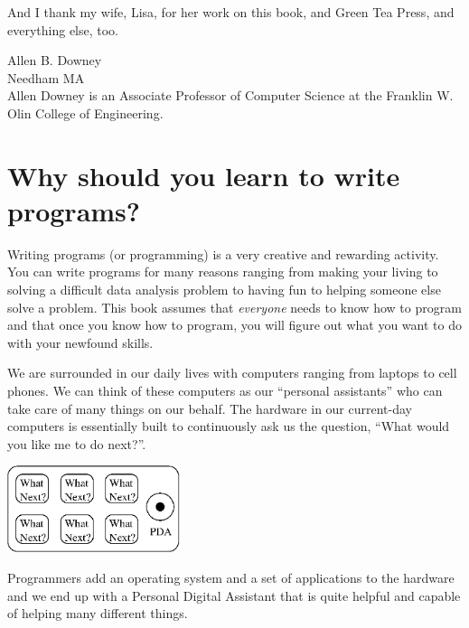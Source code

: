 \documentclass[11pt]{book}
\begin{document}
And I thank my wife, Lisa, for her work on this book, and Green
Tea Press, and everything else, too.

Allen B. Downey \\
Needham MA\\

Allen Downey is an Associate Professor of Computer Science at 
the Franklin W. Olin College of Engineering.


\clearemptydoublepage

\begin{latexonly}

\tableofcontents

\clearemptydoublepage

\end{latexonly}

\mainmatter

\chapter{Why should you learn to write programs?}

Writing programs (or programming) is a very creative 
and rewarding activity.  You can write programs for 
many reasons ranging from making your living to solving
a difficult data analysis problem to having fun to helping
someone else solve a problem.  This book assumes that 
\emph{everyone} needs to know how to program and that once 
you know how to program, you will figure out what you want 
to do with your newfound skills.  

We are surrounded in our daily lives with computers ranging 
from laptops to cell phones.  We can think of these computers
as our ``personal assistants'' who can take care of many things
on our behalf.  The hardware in our current-day computers 
is essentially built to continuously ask us the question, 
``What would you like me to do next?''.

\beforefig
\centerline{\includegraphics[height=1.00in]{figs2/pda.eps}}
\afterfig

Programmers add an operating system and a set of applications
to the hardware and we end up with a Personal Digital
Assistant that is quite helpful and capable of helping
many different things.
\end{document}
